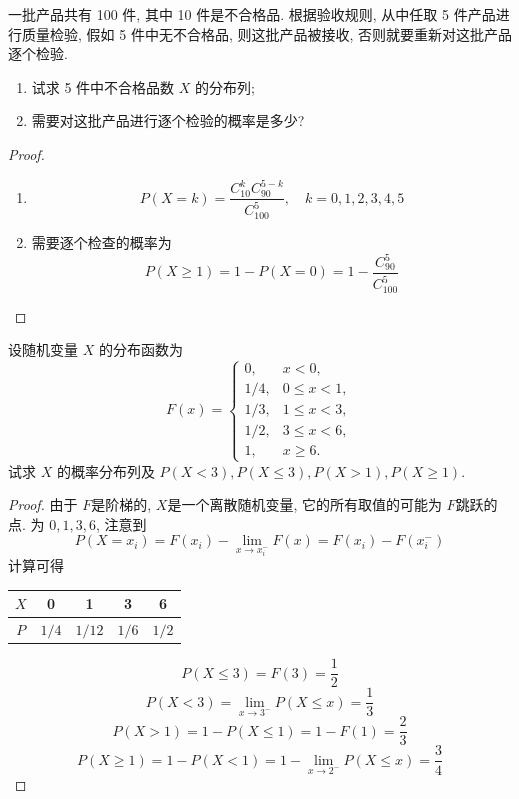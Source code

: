 \documentclass[../main.tex]{subfiles}
\begin{document}
\begin{exercise}{}{}
一批产品共有 100 件, 其中 10 件是不合格品. 根据验收规则, 从中任取 5 件产品进行质量检验, 假如 5 件中无不合格品, 则这批产品被接收, 否则就要重新对这批产品逐个检验.
\begin{enumerate}
    \item 试求 5 件中不合格品数 $X$ 的分布列;
    \item 需要对这批产品进行逐个检验的概率是多少?
\end{enumerate}
\end{exercise}

\begin{proof}
    \begin{enumerate}
        \item  \[
        P\left( X= k \right)= \frac{ C_{10}^{k}C_{90}^{5-k}}{C_{100}^{5} }  ,\quad k= 0,1,2,3,4,5
        \]
        \item 需要逐个检查的概率为 \[
      P\left( X\ge 1 \right)= 1-   P\left( X= 0 \right)= 1- \frac{C_{90}^{5} }{C_{100}^{5} } 
        \]
    \end{enumerate}
    
\end{proof}
\begin{exercise}{}{}
设随机变量 $X$ 的分布函数为
\[
F(x) = \begin{cases} 0, & x < 0, \\ 1/4, & 0 \le x < 1, \\ 1/3, & 1 \le x < 3, \\ 1/2, & 3 \le x < 6, \\ 1, & x \ge 6. \end{cases}
\]
试求 $X$ 的概率分布列及 $P(X < 3), P(X \le 3), P(X > 1), P(X \ge 1)$.
\end{exercise}
\begin{proof}
由于 \(  F  \)是阶梯的,  \(  X  \)是一个离散随机变量, 它的所有取值的可能为 \(  F  \)跳跃的点. 为 \(  0,1,3,6  \), 注意到\[
P(X = x_i) = F(x_i) - \lim_{x \to x_i^-} F(x) = F(x_i) - F(x_i^-) 
\]计算可得   \begin{tabular}{|c|c|c|c|c|}

\(X\) & 0 & 1 & 3 & 6 \\
\hline
\(P\) & \(1/4\) & \(1/12\) & \(1/6\) & \(1/2\) \\

\end{tabular}
     \[
    P\left( X\le 3 \right)= F\left( 3 \right)= \frac{1 }{2 }   
    \] \[
    P\left( X< 3 \right)= \lim_{x\to 3^{-}}P\left( X\le x \right)  = \frac{1 }{3 } 
    \] \[
    P\left( X> 1 \right)= 1-P\left( X\le 1 \right)= 1-F\left( 1 \right)= \frac{2 }{3 }    
    \] \[
    P\left( X\ge 1 \right)= 1-P\left( X< 1 \right)= 1-\lim_{x\to 2^{-}}P\left( X\le x \right)= \frac{3 }{4 }    
    \]
\end{proof}
\end{document}
